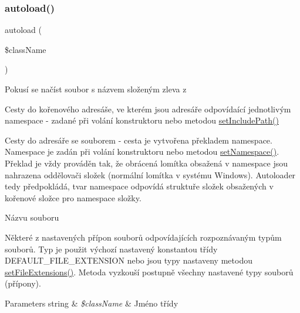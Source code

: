 \subsubsection{\texorpdfstring{autoload()}{autoload()}}
{\footnotesize\ttfamily autoload (\begin{DoxyParamCaption}\item[{}]{\$class\+Name }\end{DoxyParamCaption})}

Pokusí se načíst soubor s názvem složeným zleva z 
\begin{DoxyItemize}
\item Cesty do kořenového adresáše, ve kterém jsou adresáře odpovídaící jednotlivým namespace -\/ zadané při volání konstruktoru nebo metodou \mbox{\hyperlink{class_autoloader___autoloader_o_l_d_a24c05c7b3a2132d294fe918e1e64c416}{set\+Include\+Path()}} 
\item Cesty do adresáře se souborem -\/ cesta je vytvořena překladem namespace. Namespace je zadán při volání konstruktoru nebo metodou \mbox{\hyperlink{class_autoloader___autoloader_o_l_d_a37949ed2c12b42fb654edc1bac8569ba}{set\+Namespace()}}. Překlad je vždy prováděn tak, že obrácená lomítka obsažená v namespace jsou nahrazena oddělovači složek (normální lomítka v systému Windows). Autoloader tedy předpokládá, tvar namespace odpovídá struktuře složek obsažených v kořenové složce pro namespace složky. 
\item Názvu souboru 
\item Některé z nastavených přípon souborů odpovídajících rozpoznávaným typům souborů. Typ je použit výchozí nastavený konstantou třídy D\+E\+F\+A\+U\+L\+T\+\_\+\+F\+I\+L\+E\+\_\+\+E\+X\+T\+E\+N\+S\+I\+ON nebo jsou typy nastaveny metodou \mbox{\hyperlink{class_autoloader___autoloader_o_l_d_a3781873530da3a8721381053da0107a1}{set\+File\+Extensions()}}. Metoda vyzkouší postupně všechny nastavené typy souborů (přípony). 
\end{DoxyItemize}
\begin{DoxyParams}[1]{Parameters}
string & {\em \$class\+Name} & Jméno třídy \\
\hline
\end{DoxyParams}
\mbox{\label{class_autoloader___autoloader_o_l_d_acedc0a8c9730ae9acf267a624d8bb5a7}} 
